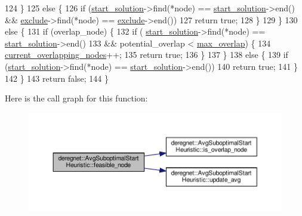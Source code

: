 \begin{DoxyCode}
124         \}
125         \textcolor{keywordflow}{else} \{
126             \textcolor{keywordflow}{if} (\hyperlink{classderegnet_1_1DeregnetStartHeuristic_a7450e11ca0a265b055f95e7832b65e2f}{start\_solution}->find(*node) == \hyperlink{classderegnet_1_1DeregnetStartHeuristic_a7450e11ca0a265b055f95e7832b65e2f}{start\_solution}->end() && 
      \hyperlink{classderegnet_1_1DeregnetStartHeuristic_aa22c6581cd404bf7ac325850b28dc951}{exclude}->find(*node) == \hyperlink{classderegnet_1_1DeregnetStartHeuristic_aa22c6581cd404bf7ac325850b28dc951}{exclude}->end())
127                 \textcolor{keywordflow}{return} \textcolor{keyword}{true};
128         \}
129     \}
130     \textcolor{keywordflow}{else} \{
131         \textcolor{keywordflow}{if} (overlap\_node) \{
132             \textcolor{keywordflow}{if} (   \hyperlink{classderegnet_1_1DeregnetStartHeuristic_a7450e11ca0a265b055f95e7832b65e2f}{start\_solution}->find(*node) == \hyperlink{classderegnet_1_1DeregnetStartHeuristic_a7450e11ca0a265b055f95e7832b65e2f}{start\_solution}->end()
133                 && potential\_overlap < \hyperlink{classderegnet_1_1AvgSuboptimalStartHeuristic_a6e019ada1557663d456e7f81757d14ab}{max\_overlap}) \{
134                 \hyperlink{classderegnet_1_1AvgSuboptimalStartHeuristic_ad541b941d327ba928a7951e43ad1fea4}{current\_overlapping\_nodes}++;
135                 \textcolor{keywordflow}{return} \textcolor{keyword}{true};
136             \}
137         \}
138         \textcolor{keywordflow}{else} \{
139             \textcolor{keywordflow}{if} (\hyperlink{classderegnet_1_1DeregnetStartHeuristic_a7450e11ca0a265b055f95e7832b65e2f}{start\_solution}->find(*node) == \hyperlink{classderegnet_1_1DeregnetStartHeuristic_a7450e11ca0a265b055f95e7832b65e2f}{start\_solution}->end())
140                 \textcolor{keywordflow}{return} \textcolor{keyword}{true};
141         \}
142     \}
143     \textcolor{keywordflow}{return} \textcolor{keyword}{false};
144 \}
\end{DoxyCode}
Here is the call graph for this function\+:\nopagebreak
\begin{figure}[H]
\begin{center}
\leavevmode
\includegraphics[width=350pt]{classderegnet_1_1AvgSuboptimalStartHeuristic_aca3dd2ae41b88a0bd925b297d490e2cb_cgraph}
\end{center}
\end{figure}
